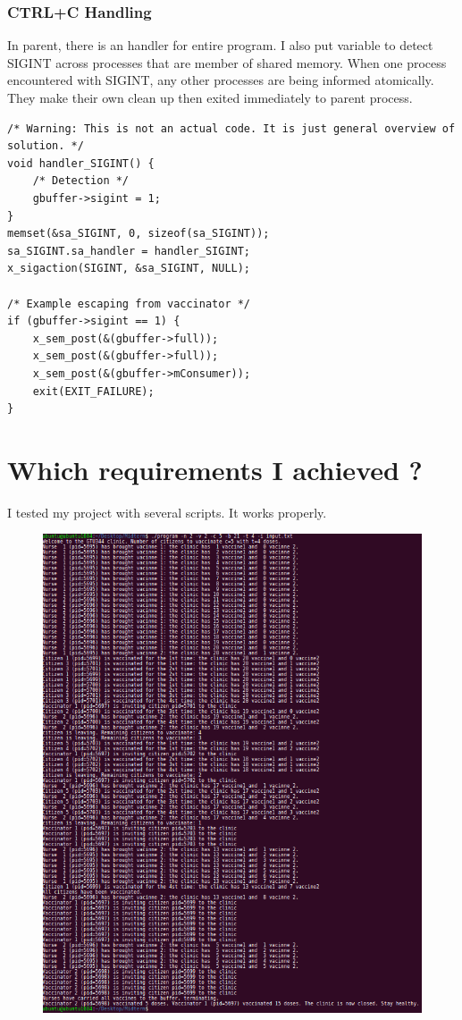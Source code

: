 \documentclass{article}
\begin{document}
\subsubsection{CTRL+C Handling}
In parent, there is an handler for entire program. I also put variable to detect SIGINT across processes that are member of shared memory. When one process encountered with SIGINT, any other processes are being informed atomically. They make their own clean up then exited immediately to parent process.
\begin{lstlisting}[style=CStyle]
/* Warning: This is not an actual code. It is just general overview of solution. */
void handler_SIGINT() {
    /* Detection */
    gbuffer->sigint = 1;
}
memset(&sa_SIGINT, 0, sizeof(sa_SIGINT));
sa_SIGINT.sa_handler = handler_SIGINT;
x_sigaction(SIGINT, &sa_SIGINT, NULL);

/* Example escaping from vaccinator */
if (gbuffer->sigint == 1) {
    x_sem_post(&(gbuffer->full));
    x_sem_post(&(gbuffer->full));
    x_sem_post(&(gbuffer->mConsumer));
    exit(EXIT_FAILURE);
}
\end{lstlisting}
\section{Which requirements I achieved ?}
I tested my project with several scripts. It works properly.
\begin{figure}[H]
\includegraphics[width=1\textwidth, left]{output.png}
\caption[Optional caption]{}
\label{}
\end{figure}                    
\end{document}
